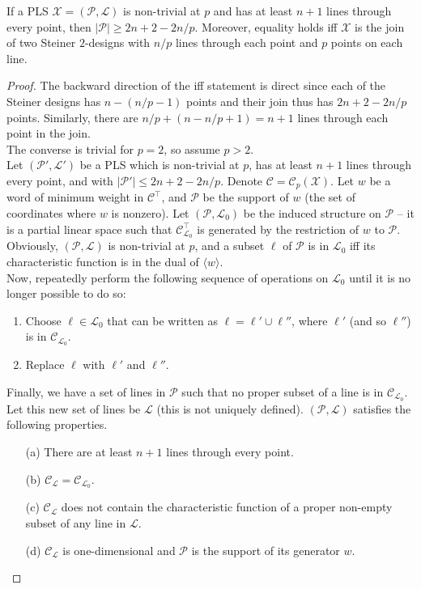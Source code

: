 	\begin{ftheo}
		If a PLS $\mathcal{X} = (\mathcal{P},\mathcal{L})$ is non-trivial at $p$ and has at least $n+1$ lines through every point, then $|\mathcal{P}| \ge 2n+2-2n/p$. Moreover, equality holds iff $\mathcal{X}$ is the join of two Steiner $2$-designs with $n/p$ lines through each point and $p$ points on each line.
	\end{ftheo}
	\begin{proof}
		The backward direction of the iff statement is direct since each of the Steiner designs has $n - (n/p - 1)$ points and their join thus has $2n+2-2n/p$ points. Similarly, there are $n/p + (n - n/p + 1) = n+1$ lines through each point in the join.\\
		
		The converse is trivial for $p = 2$, so assume $p > 2$. \\
		Let $(\mathcal{P}',\mathcal{L}')$ be a PLS which is non-trivial at $p$, has at least $n+1$ lines through every point, and with $|\mathcal{P}'| \le 2n+2-2n/p$. Denote $\mathcal{C} = \mathcal{C}_p(\mathcal{X})$. Let $w$ be a word of minimum weight in $\mathcal{C}^\top$, and $\mathcal{P}$ be the support of $w$ (the set of coordinates where $w$ is nonzero). Let $(\mathcal{P},\mathcal{L}_0)$ be the induced structure on $\mathcal{P}$ -- it is a partial linear space such that $\mathcal{C}_{\mathcal{L}_0}^\top$ is generated by the restriction of $w$ to $\mathcal{P}$. Obviously, $(\mathcal{P},\mathcal{L})$ is non-trivial at $p$, and a subset $\ell$ of $\mathcal{P}$ is in $\mathcal{L}_0$ iff its characteristic function is in the dual of $\langle w \rangle$.\\
		Now, repeatedly perform the following sequence of operations on $\mathcal{L}_0$ until it is no longer possible to do so:
		\begin{enumerate}
			\item Choose $\ell \in \mathcal{L}_0$ that can be written as $\ell = \ell' \cup \ell''$, where $\ell'$ (and so $\ell''$) is in $\mathcal{C}_{\mathcal{L}_0}$.
			\item Replace $\ell$ with $\ell'$ and $\ell''$.
		\end{enumerate}
		Finally, we have a set of lines in $\mathcal{P}$ such that no proper subset of a line is in $\mathcal{C}_{\mathcal{L}_0}$. Let this new set of lines be $\mathcal{L}$ (this is not uniquely defined). $(\mathcal{P},\mathcal{L})$ satisfies the following properties.
		\begin{itemize}
			\item[(a)] There are at least $n+1$ lines through every point.
			\item[(b)] $\mathcal{C}_{\mathcal{L}} = \mathcal{C}_{\mathcal{L}_0}$.
			\item[(c)] $\mathcal{C}_{\mathcal{L}}$ does not contain the characteristic function of a proper non-empty subset of any line in $\mathcal{L}$.
			\item[(d)] $\mathcal{C}_{\mathcal{L}}$ is one-dimensional and $\mathcal{P}$ is the support of its generator $w$.
		\end{itemize}


\end{proof}
